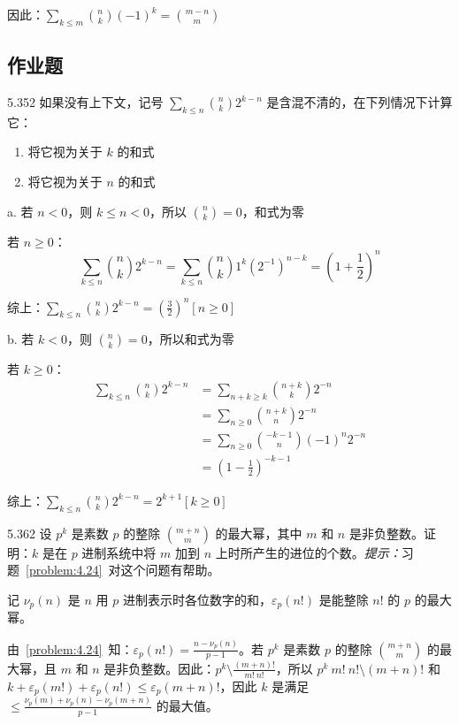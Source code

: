 因此：\( \sum_{k \le m} \binom{n}{k} (-1)^k = \binom{m-n}{m} \)

\subsection{作业题}

\begin{problem}{5.35}{2}
  如果没有上下文，记号 \( \sum_{k \le n} \binom{n}{k} 2^{k-n} \) 是含混不清的，在下列情况下计算它：
  \begin{enumerate}
    \item [a] 将它视为关于 \( k \) 的和式
    \item [b] 将它视为关于 \( n \) 的和式
  \end{enumerate}
\end{problem}

a. 若 \( n < 0 \)，则 \( k \le n < 0 \)，所以 \( \binom{n}{k} = 0 \)，和式为零

若 \( n \ge 0 \)：
\[
  \sum_{k \le n} \binom{n}{k} 2^{k-n} = \sum_{k \le n} \binom{n}{k} 1^k (2^{-1})^{n-k} = (1+\frac{1}{2})^n
\]

综上：\( \sum_{k \le n} \binom{n}{k} 2^{k-n} = (\frac{3}{2})^n [n \ge 0] \)

b. 若 \( k < 0 \)，则 \( \binom{n}{k} = 0 \)，所以和式为零

若 \( k \ge 0 \)：
\begin{align*}
  \sum_{k \le n} \binom{n}{k} 2^{k-n} &= \sum_{n+k \ge k} \binom{n+k}{k} 2^{-n} \\
  &= \sum_{n \ge 0} \binom{n+k}{n} 2^{-n} \\
  &= \sum_{n \ge 0} \binom{-k-1}{n} (-1)^n 2^{-n} \\
  &= (1-\frac{1}{2})^{-k-1}
\end{align*}

综上：\( \sum_{k \le n} \binom{n}{k} 2^{k-n} = 2^{k+1} [k \ge 0] \)

\begin{problem}{5.36}{2}
  设 \( p^k \) 是素数 \( p \) 的整除 \( \binom{m+n}{m} \) 的最大幂，其中 \( m \) 和 \( n \) 是非负整数。证明：\( k \) 是在 \( p \) 进制系统中将 \( m \) 加到 \( n \) 上时所产生的进位的个数。\textit{提示：}习题~\ref{problem:4.24}~对这个问题有帮助。
\end{problem}

记 \( \nu_p (n) \) 是 \( n \) 用 \( p \) 进制表示时各位数字的和，\( \varepsilon_p(n!) \) 是能整除 \( n! \) 的 \( p \) 的最大幂。

由~\ref{problem:4.24}~知：\( \varepsilon_p (n!)= \frac{n - \nu_p (n)}{p-1} \)。若 \( p^k \) 是素数 \( p \) 的整除 \( \binom{m+n}{m} \) 的最大幂，且 \( m \) 和 \( n \) 是非负整数。因此：\( p^k \setminus \frac{(m+n)!}{m! \ n!} \)，所以 \( p^k \ m! \ n! \setminus (m+n)! \) 和 \( k + \varepsilon_p{(m!)} + \varepsilon_p{(n!)} \le \varepsilon_p{(m+n)!} \)，因此 \( k \) 是满足 \( \le \frac{\nu_p{(m)} + \nu_p{(n)} - \nu_p{(m+n)}}{p-1} \) 的最大值。

